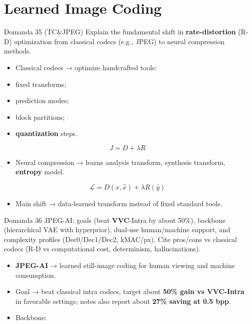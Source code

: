 \section{Learned Image Coding}




\begin{questionbox}{Domanda 35}
(TC\&JPEG) Explain the fundamental shift in \textbf{\textbf{rate}-\textbf{distortion}} (R-D) optimization from classical codecs (e.g., JPEG) to neural compression methods.
\end{questionbox}


\begin{itemize}
  \item Classical codecs → optimize handcrafted tools:
  \item fixed transforms;
  \item prediction modes;
  \item block partitions;
  \item \textbf{quantization} steps.
\end{itemize}


$$
J = D + \lambda R
$$


\begin{itemize}
  \item Neural compression → learns analysis transform, synthesis transform, \textbf{entropy} model.
\end{itemize}


$$
\mathcal{L}=D(x,\hat{x})+\lambda R(\hat{y})
$$


\begin{itemize}
  \item Main shift → data-learned transform instead of fixed standard tools.
\end{itemize}



\begin{questionbox}{Domanda 36}
JPEG-AI: goals (beat \textbf{VVC}-Intra by about 50\%), backbone (hierarchical VAE with hyperprior), dual-use human/machine support, and complexity profiles (Dec0/Dec1/Dec2, kMAC/px). Cite pros/cons vs classical codecs (R-D vs computational cost, determinism, hallucinations).
\end{questionbox}


\begin{itemize}
  \item \textbf{JPEG-AI} → learned still-image coding for human viewing and machine consumption.
  \item Goal → beat classical intra codecs, target about \textbf{50\% gain vs \textbf{VVC}-Intra} in favorable settings; notes also report about \textbf{27\% saving at 0.5 bpp}.
  \item Backbone:
\end{itemize}


